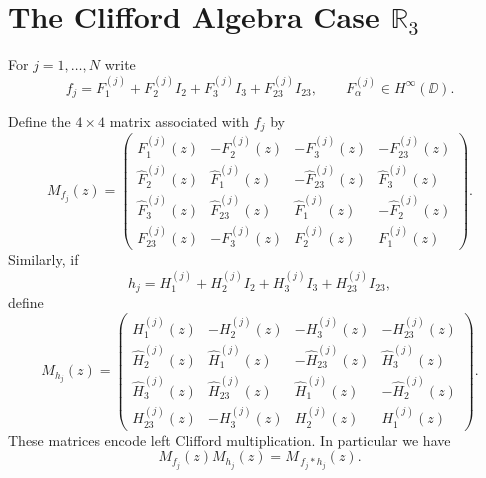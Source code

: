 \documentclass[11pt]{amsart}
\begin{document}
\section{\texorpdfstring{The Clifford Algebra Case $\mathbb{R}_3$}{The Clifford Algebra Case R3}}

For $j=1,\dots,N$ write
\[
f_j
=
F_{1}^{(j)}
+
F_{2}^{(j)} I_2
+
F_{3}^{(j)} I_3
+
F_{23}^{(j)} I_{23},
\qquad
F_{\alpha}^{(j)}\in H^\infty(\DD).
\]

Define the $4\times4$ matrix associated with $f_j$ by
\begin{equation}\label{eq:Mf_clifford_general}
M_{f_j}(z)=
\begin{pmatrix}
F_{1}^{(j)}(z) & -F_{2}^{(j)}(z) & -F_{3}^{(j)}(z) & -F_{23}^{(j)}(z) \\
\hat{F}_{2}^{(j)}(z) & \hat{F}_{1}^{(j)}(z) & -\hat{F}_{23}^{(j)}(z) & \hat{F}_{3}^{(j)}(z) \\
\hat{F}_{3}^{(j)}(z) & \hat{F}_{23}^{(j)}(z) & \hat{F}_{1}^{(j)}(z) & -\hat{F}_{2}^{(j)}(z) \\
F_{23}^{(j)}(z) & -F_{3}^{(j)}(z) & F_{2}^{(j)}(z) & F_{1}^{(j)}(z)
\end{pmatrix}.
\end{equation}
Similarly, if
\[
h_j
=
H_{1}^{(j)}
+
H_{2}^{(j)} I_2
+
H_{3}^{(j)} I_3
+
H_{23}^{(j)} I_{23},
\]
define
\begin{equation}\label{eq:Mg_clifford_general}
M_{h_j}(z)=
\begin{pmatrix}
H_{1}^{(j)}(z) & -H_{2}^{(j)}(z) & -H_{3}^{(j)}(z) & -H_{23}^{(j)}(z) \\
\hat{H}_{2}^{(j)}(z) & \hat{H}_{1}^{(j)}(z) & -\hat{H}_{23}^{(j)}(z) & \hat{H}_{3}^{(j)}(z) \\
\hat{H}_{3}^{(j)}(z) & \hat{H}_{23}^{(j)}(z) & \hat{H}_{1}^{(j)}(z) & -\hat{H}_{2}^{(j)}(z) \\
H_{23}^{(j)}(z) & -H_{3}^{(j)}(z) & H_{2}^{(j)}(z) & H_{1}^{(j)}(z)
\end{pmatrix}.
\end{equation}
These matrices encode left Clifford multiplication.  In particular we have \begin{equation}\label{eq:matrix_product_clifford}
M_{f_j}(z)M_{h_j}(z)=M_{\,f_j*h_j}(z).
\end{equation}

\medskip
\end{document}
